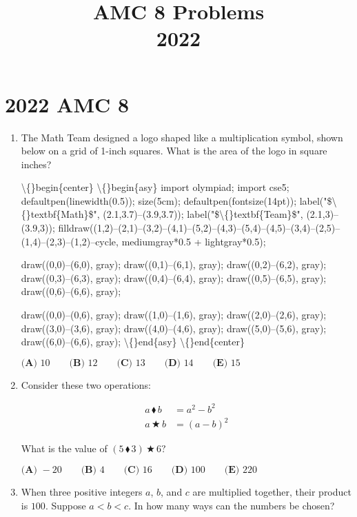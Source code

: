 \documentclass{article}
\title{AMC 8 Problems \\ 2022}
\date{}
\begin{document}
\maketitle\thispagestyle{fancy}\newpage\section*{2022 AMC 8}\begin{enumerate}[label=\arabic*., itemsep=0.5em]\item The Math Team designed a logo shaped like a multiplication symbol, shown below on a grid of 1-inch squares. What is the area of the logo in square inches?


\textbackslash\{\}begin\{center\}
\textbackslash\{\}begin\{asy\}
import olympiad;
import cse5;
defaultpen(linewidth(0.5));
size(5cm);
defaultpen(fontsize(14pt));
label("\$\textbackslash\{\}textbf\{Math\}\$", (2.1,3.7)--(3.9,3.7));
label("\$\textbackslash\{\}textbf\{Team\}\$", (2.1,3)--(3.9,3));
filldraw((1,2)--(2,1)--(3,2)--(4,1)--(5,2)--(4,3)--(5,4)--(4,5)--(3,4)--(2,5)--(1,4)--(2,3)--(1,2)--cycle, mediumgray*0.5 + lightgray*0.5);

draw((0,0)--(6,0), gray);
draw((0,1)--(6,1), gray);
draw((0,2)--(6,2), gray);
draw((0,3)--(6,3), gray);
draw((0,4)--(6,4), gray);
draw((0,5)--(6,5), gray);
draw((0,6)--(6,6), gray);

draw((0,0)--(0,6), gray);
draw((1,0)--(1,6), gray);
draw((2,0)--(2,6), gray);
draw((3,0)--(3,6), gray);
draw((4,0)--(4,6), gray);
draw((5,0)--(5,6), gray);
draw((6,0)--(6,6), gray);
\textbackslash\{\}end\{asy\}
\textbackslash\{\}end\{center\}


\(\textbf{(A) } 10 \qquad \textbf{(B) } 12 \qquad \textbf{(C) } 13 \qquad \textbf{(D) } 14 \qquad \textbf{(E) } 15\)\par \vspace{0.5em}\item Consider these two operations:

\begin{align*}
a \, \blacklozenge \, b &= a^2 - b^2\\
a \, \bigstar \, b &= (a - b)^2
\end{align*}

What is the value of \((5 \, \blacklozenge \, 3) \, \bigstar \, 6?\)

\(\textbf{(A) } {-}20 \qquad \textbf{(B) } 4 \qquad \textbf{(C) } 16 \qquad \textbf{(D) } 100 \qquad \textbf{(E) } 220\)\par \vspace{0.5em}\item When three positive integers \(a\), \(b\), and \(c\) are multiplied together, their product is \(100\). Suppose \(a < b < c\). In how many ways can the numbers be chosen?


\end{enumerate}
\end{document}
